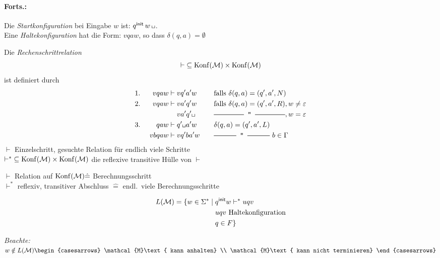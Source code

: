 \paragraph{Forts.:} Die \emph{Startkonfiguration} bei Eingabe $w$ ist: $\qinit\,w\,\blank$.
\\
Eine \emph{Haltekonfiguration} hat die Form: $vqaw$, so dass $\delta(q,a)=\emptyset$

\begin{Def}[name={[Rechenschrittrelation]}] %
	Die \emph{Rechenschrittrelation}
	\[ {\vdash} \subseteq \operatorname{Konf}(\mathcal{M})\times\operatorname{Konf}(\mathcal{M}) \]
	ist definiert durch
	\begin{alignat*}{3}
		1.&\ & v qaw &\vdash v q'a'w &\quad& \text{falls }\delta(q,a)=(q',a',N)\\
		2.&& v qaw &\vdash v a'q'w && \text{falls }\delta(q,a)=(q',a',R), w\neq \Eps\\
		&&&\phantom{{}\vdash{}} v a'q'\blank && \ruleplaceholder{\widthof{falls $\delta(q,a)=(q',a',R)$}}, w=\Eps\\
		3.&& qaw &\vdash q'\blank a'w && \delta(q,a)=(q',a',L)\\
		&& vbqaw &\vdash vq'ba'w && \ruleplaceholder{\widthof{$\delta(q,a)=(q',a',L)$}}\  b\in\Gamma
	\end{alignat*}
	$\vdash$ Einzelschritt, gesuchte Relation für endlich viele Schritte \smallskip\\
	${\vdash^*} \subseteq \operatorname{Konf}(\mathcal{M}) \times \operatorname{Konf}(\mathcal{M})$ die reflexive transitive Hülle von $\vdash$
\end{Def}


$\vdash$ Relation auf $\operatorname{Konf}(\mathcal{M})\hat=$ Berechnungsschritt\\
$\vdash^*$ reflexiv, transitiver Abschluss $\hat=$ endl.\ viele Berechnungsschritte
%
%
\begin{Def} %
	\begin{align*}
		L(\mathcal{M})=\{ w\in\Sigma^* \mid{}
		& q^\mathsf{init} w \vdash^*uqv\\
		&uqv \text{ Haltekonfiguration}\\
		&q\in F\}
	\end{align*}
\end{Def}
\emph{Beachte:}
$w\notin L(\mathcal{M})\begin{casesarrows}
\mathcal{M}\text{ kann anhalten}          \\
\mathcal{M}\text{ kann nicht terminieren}
\end{casesarrows}$

